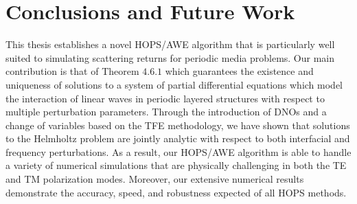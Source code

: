 \chapter{Conclusions and Future Work}
\label{sec:conclusions_and_future_dir}


This thesis establishes a novel HOPS/AWE algorithm that is particularly well suited to simulating scattering returns for periodic media problems. Our main contribution is that of Theorem $4.6.1$ which guarantees the existence and uniqueness of solutions to a system of partial differential equations which model the interaction of linear waves in periodic layered structures with respect to multiple perturbation parameters. Through the introduction of DNOs and a change of variables based on the TFE methodology, we have shown that solutions to the Helmholtz problem are jointly analytic with respect to both interfacial and frequency perturbations. As a result, our HOPS/AWE algorithm is able to handle a variety of numerical simulations that are physically challenging in both the TE and TM polarization modes. Moreover, our extensive numerical results demonstrate the accuracy, speed, and robustness expected of all HOPS methods.








